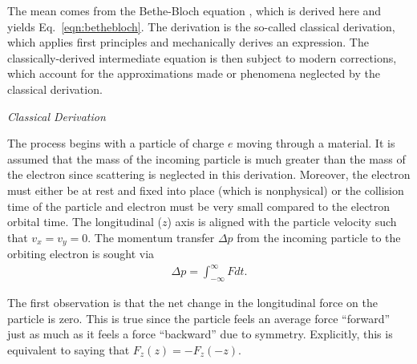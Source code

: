 The mean comes from the Bethe-Bloch equation \cite{bethebloch}, which is derived here and yields Eq.~\eqref{eqn:bethebloch}. The derivation is the so-called classical derivation, which applies first principles and mechanically derives an expression. The classically-derived intermediate equation is then subject to modern corrections, which account for the approximations made or phenomena neglected by the classical derivation.

\noindent \textit{\large Classical Derivation}

The process begins with a particle of charge $e$ moving through a material. It is assumed that the mass of the incoming particle is much greater than the mass of the electron since scattering is neglected in this derivation. Moreover, the electron must either be at rest and fixed into place (which is nonphysical) or the collision time of the particle and electron must be very small compared to the electron orbital time. The longitudinal ($z$) axis is aligned with the particle velocity such that $v_x=v_y=0$. The momentum transfer $\Delta p$ from the incoming particle to the orbiting electron is sought via
\begin{align*}
\Delta p =  \int_{-\infty} ^\infty F dt.
\end{align*}

The first observation is that the net change in the longitudinal force on the particle is zero. This is true since the particle feels an average force ``forward'' just as much as it feels a force ``backward'' due to symmetry. Explicitly, this is equivalent to saying that $F_z(z)=-F_z(-z)$.

